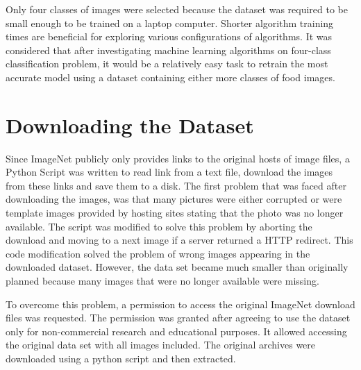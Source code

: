 Only four classes of images were selected because the dataset was required to be small enough to be trained on a laptop computer. Shorter algorithm training times are beneficial for exploring various configurations of algorithms.  It was considered that after investigating machine learning algorithms on four-class classification problem, it would be a relatively easy task to retrain the most accurate model using  a dataset containing either more classes of food images.

\section {Downloading the Dataset}
Since ImageNet publicly only provides links to the original hosts of image files,  a Python Script was written to read link from a text file, download the images from these links and save them to a disk.  The first problem that was faced after downloading the images, was that many pictures were either corrupted or were template images provided by hosting sites stating that the photo was no longer available. The script was modified to solve this problem by aborting the download and moving to a next image if a server returned a HTTP redirect. This code modification solved the problem of wrong images appearing in the downloaded dataset. However, the data set became much smaller than originally planned because many images that were no longer available were missing.  

To overcome this problem, a permission to access the original ImageNet download files was requested. The permission was granted after agreeing to use the dataset only for non-commercial research and educational purposes. It allowed accessing the original data set with all images included. The original archives were downloaded using a python script and then extracted.

